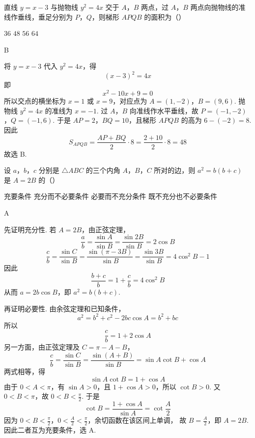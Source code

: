 \begin{problem}
直线 \( y = x - 3 \) 与抛物线 \( y^{2} = 4x \) 交于 \(A\)，\(B\) 两点，过 \(A\)，\(B\) 两点向抛物线的准线作垂线，垂足分别为 \(P\)，\(Q\)，则梯形 \(APQB\) 的面积为（\quad）

\choices
    {\(36\)}
    {\(48\)}
    {\(56\)}
    {\(64\)}
\end{problem}

\begin{answer}
B
\end{answer}

\begin{solution}
将 \(y=x-3\) 代入 \(y^2=4x\)，得
\[
(x-3)^2=4x
\]
即
\[
x^2-10x+9=0
\]
所以交点的横坐标为 \(x=1\) 或 \(x=9\)，对应点为
\(A=(1,-2)\)，\(B=(9,6)\).
抛物线 \(y^2=4x\) 的准线为 \(x=-1\). 过 \(A\)，\(B\) 向准线作水平垂线，故
\(P=(-1,-2)\)，\(Q=(-1,6)\).
于是 \(AP=2\)，\(BQ=10\)，且梯形 \(APQB\) 的高为 \(6-(-2)=8\). 因此
\[
S_{APQB}=\frac{AP+BQ}{2}\cdot8=\frac{2+10}{2}\cdot8=48
\]
故选 B.
\end{solution}

\begin{problem}
设 \(a\)，\(b\)，\(c\) 分别是 \(\triangle ABC\) 的三个内角 \(A\)，\(B\)，\(C\) 所对的边，则 \(a^2 = b(b + c)\) 是 \(A = 2B\) 的（\quad）

\choices
    {充要条件}
    {充分而不必要条件}
    {必要而不充分条件}
    {既不充分也不必要条件}
\end{problem}

\begin{answer}
A
\end{answer}

\begin{solution}
先证明充分性. 若 \(A=2B\)，由正弦定理，
\[
\frac{a}{b}=\frac{\sin A}{\sin B}=\frac{\sin2B}{\sin B}=2\cos B
\]
\[
\frac{c}{b}=\frac{\sin C}{\sin B}
=\frac{\sin(\pi-3B)}{\sin B}
=\frac{\sin3B}{\sin B}
=4\cos^2B-1
\]
因此
\[
\frac{b+c}{b}=1+\frac{c}{b}=4\cos^2B
\]
从而 \(a=2b\cos B\)，即 \(a^2=b(b+c)\).

再证明必要性. 由余弦定理和已知条件，
\[
a^2=b^2+c^2-2bc\cos A=b^2+bc
\]
所以
\[
\frac{c}{b}=1+2\cos A
\]
另一方面，由正弦定理及 \(C=\pi-A-B\)，
\[
\frac{c}{b}=\frac{\sin C}{\sin B}
=\frac{\sin(A+B)}{\sin B}
=\sin A\cot B+\cos A
\]
两式相等，得
\[
\sin A\cot B=1+\cos A
\]
由于 \(0<A<\pi\)，有 \(\sin A>0\)，且 \(1+\cos A>0\)，所以 \(\cot B>0\). 又
\(0<B<\pi\)，故 \(0<B<\frac{\pi}{2}\). 于是
\[
\cot B=\frac{1+\cos A}{\sin A}=\cot\frac{A}{2}
\]
因为 \(0<B<\frac{\pi}{2}\)，\(0<\frac{A}{2}<\frac{\pi}{2}\)，余切函数在该区间上单调，
故 \(B=\frac{A}{2}\)，即 \(A=2B\). 因此二者互为充要条件，选 A.
\end{solution}

